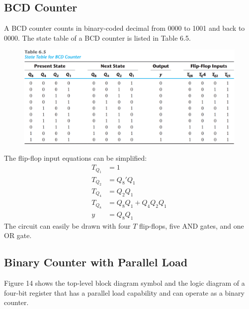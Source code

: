 \subsection{BCD Counter}
\label{subsec:bcd-counter}

A BCD counter counts in binary-coded decimal from 0000 to 1001 and back to 0000. The state table of a BCD counter is listed in Table 6.5.

\begin{figure}[H]
  \centering
  \includegraphics[width=.85\linewidth]{img/table-6.5.png}
  \label{table:6.5}
\end{figure}

The flip-flop input equations can be simplified:
\begin{align*}
  T_{Q_1} &= 1\\
  T_{Q_2} &= Q_8'Q_1\\
  T_{Q_4} &= Q_2Q_1\\
  T_{Q_8} &= Q_8Q_1 + Q_4Q_2Q_1\\
  y &= Q_8Q_1
\end{align*}
The circuit can easily be drawn with four $T$ flip-flops, five AND gates, and one OR gate.

\subsection{Binary Counter with Parallel Load}
\label{subsec:bin-counter-with-parallel-load}

Figure 14 shows the top-level block diagram symbol and the logic diagram of a four-bit register that has a parallel load capability and can operate as a binary counter.

